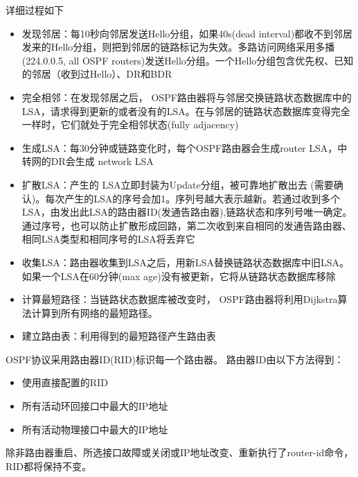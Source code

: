 详细过程如下
\begin{itemize}
	\item 发现邻居：每10秒向邻居发送Hello分组，如果40s(dead interval)都收不到邻居发来的Hello分组，则把到邻居的链路标记为失效。多路访问网络采用多播(224.0.0.5, all OSPF routers)发送Hello分组。一个Hello分组包含优先权、已知的邻居（收到过Hello）、DR和BDR
	\item 完全相邻：在发现邻居之后， OSPF路由器将与邻居交换链路状态数据库中的LSA，请求得到更新的或者没有的LSA。在与邻居的链路状态数据库变得完全一样时，它们就处于完全相邻状态(fully adjacency)
	\item 生成LSA：每30分钟或链路变化时，每个OSPF路由器会生成router LSA，中转网的DR会生成	network LSA
	\item 扩散LSA：产生的 LSA立即封装为Update分组，被可靠地扩散出去 (需要确认)。每次产生的LSA的序号会加1。序列号越大表示越新。若通过收到多个LSA，由发出此LSA的路由器ID(发通告路由器),链路状态和序列号唯一确定。通过序号，也可以防止扩散形成回路，第二次收到来自相同的发通告路由器、相同LSA类型和相同序号的LSA将丢弃它
	\item 收集LSA：路由器收集到LSA之后，用新LSA替换链路状态数据库中旧LSA。如果一个LSA在60分钟(max age)没有被更新，它将从链路状态数据库移除
	\item 计算最短路径：当链路状态数据库被改变时， OSPF路由器将利用Dijkstra算法计算到所有网络的最短路径。
	\item 建立路由表：利用得到的最短路径产生路由表
\end{itemize}

OSPF协议采用路由器ID(RID)标识每一个路由器。
路由器ID由以下方法得到：
\begin{itemize}
	\item 使用直接配置的RID
	\item 所有活动环回接口中最大的IP地址
	\item 所有活动物理接口中最大的IP地址
\end{itemize}
除非路由器重启、所选接口故障或关闭或IP地址改变、重新执行了router-id命令，RID都将保持不变。


